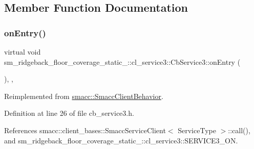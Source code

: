 \subsection{Member Function Documentation}
\mbox{\label{classsm__ridgeback__floor__coverage__static__1_1_1cl__service3_1_1CbService3_a0eda2e4af98ebc090234b7f7eacced89}} 
\subsubsection{\texorpdfstring{on\+Entry()}{onEntry()}}
{\footnotesize\ttfamily virtual void sm\+\_\+ridgeback\+\_\+floor\+\_\+coverage\+\_\+static\+\_\+::cl\+\_\+service3\+::\+Cb\+Service3\+::on\+Entry (\begin{DoxyParamCaption}{ }\end{DoxyParamCaption})\hspace{0.3cm}{\ttfamily [inline]}, {\ttfamily [override]}, {\ttfamily [virtual]}}



Reimplemented from \hyperlink{classsmacc_1_1SmaccClientBehavior_ad5d3e1f1697c3cfe66c94cadba948493}{smacc\+::\+Smacc\+Client\+Behavior}.



Definition at line 26 of file cb\+\_\+service3.\+h.



References smacc\+::client\+\_\+bases\+::\+Smacc\+Service\+Client$<$ Service\+Type $>$\+::call(), and sm\+\_\+ridgeback\+\_\+floor\+\_\+coverage\+\_\+static\+\_\+::cl\+\_\+service3\+::\+S\+E\+R\+V\+I\+C\+E3\+\_\+\+ON.


